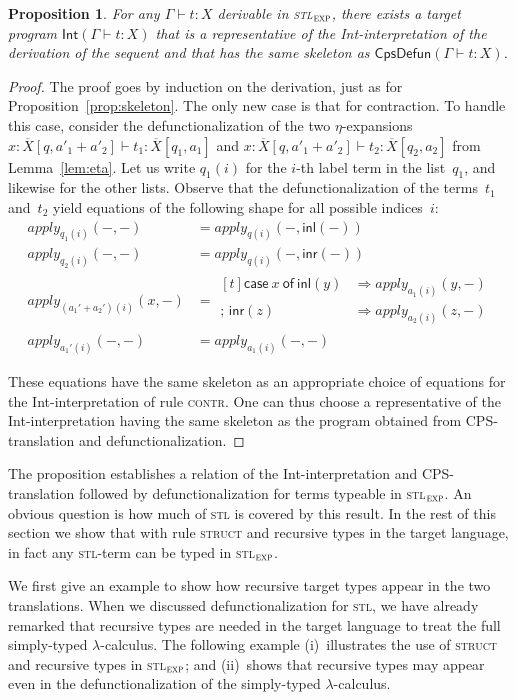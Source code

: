 \documentclass{LMCS}
\theoremstyle{definition}
\theoremstyle{plain}
\newtheorem{proposition}[thm]{Proposition}
\newcommand{\kw}[1]{\mathsf{#1}}
\newcommand{\Capply}{\textit{apply}}
\newcommand{\I}[2]{#1 \colon #2}
\newcommand{\R}[1]{\textsc{#1}}
\newcommand{\SeqTm}[3]{#1 \vdash #2 \colon #3}
\newcommand{\tmcase}[5]{\!\begin{aligned}[t]
  \kw{case}\ #1\ \kw{of}\ 
     \kw{inl}(#2) &\Rightarrow #3 \\[-.27em]
    ;\, \kw{inr}(#4) &\Rightarrow #5    
  \end{aligned}
  }
\newcommand{\semc}[1]{\kw{Int}(#1)}
\newcommand{\stlexp}{\textsc{stl}$_\textsc{exp}$\xspace}
\begin{document}
\begin{proposition}
  \label{prop:skeletonstl}
  For any\/ $\SeqTm{\Gamma}{t}{X}$ derivable in \stlexp,
  there exists a target program\/ $\semc{\SeqTm{\Gamma}{t}{X}}$ that is a representative 
  of the Int-interpretation of the derivation of the sequent and
  that has the same skeleton as\/ $\kw{CpsDefun}(\SeqTm{\Gamma}{t}{X})$.
\end{proposition}
\begin{proof}
  The proof goes by induction on the derivation, just as for
  Proposition~\ref{prop:skeleton}.
  The only new case is that for contraction.
  To handle this case, consider the defunctionalization
  of the two $\eta$-expansions
  $\SeqTm{\I x {\overline X[q, a'_1 + a'_2]}}{t_1}{\overline X[q_1, a_1]}$
  and
  $\SeqTm{\I x {\overline X[q, a'_1 + a'_2]}}{t_2}{\overline X[q_2, a_2]}$
  from Lemma~\ref{lem:eta}.
  Let us write $q_1(i)$ for the $i$-th label term in the list~$q_1$,
  and likewise for the other lists.
  Observe that the defunctionalization of the terms~$t_1$ and~$t_2$
  yield equations of the following shape
  for all possible indices~$i$:
  \begin{align*}
    \Capply_{q_1(i)}(-, -) &= \Capply_{q(i)}(-, \kw{inl}(-))\\
    \Capply_{q_2(i)}(-, -) &= \Capply_{q(i)}(-, \kw{inr}(-))\\
    \Capply_{(a_1' + a_2')(i)}(x, -) &= \tmcase x y {\Capply_{a_1(i)}(y, -)} z
   {\Capply_{a_2(i)}(z, -)}\\
   \Capply_{a_1'(i)}(-, -) &= \Capply_{a_1(i)}(-, -)
  \end{align*}

  These equations have the same skeleton as an appropriate choice of
  equations for the Int-interpretation of rule \R{contr}.
  One can thus choose a representative of the Int-interpretation 
  having the same skeleton as the program obtained from CPS-translation
  and defunctionalization.
\end{proof}

The proposition establishes a relation of the Int-interpretation and
CPS-translation followed by defunctionalization for terms typeable in \stlexp.
An obvious question is how much of \textsc{stl} is covered by this result.
In the rest of this section we show that with rule \R{struct} and 
recursive types in the target language, in fact any \textsc{stl}-term 
can be typed in \stlexp.

We first give an example to show how recursive target types appear in 
the two translations.
When we discussed defunctionalization for \textsc{stl}, we have
already remarked that recursive types are needed in the target
language to treat the full simply-typed $\lambda$-calculus.
The following example (i)~illustrates the use of 
\R{struct} and recursive types in \stlexp; and (ii)~shows that
recursive types may appear even in the defunctionalization of the
simply-typed $\lambda$-calculus.
\end{document}
